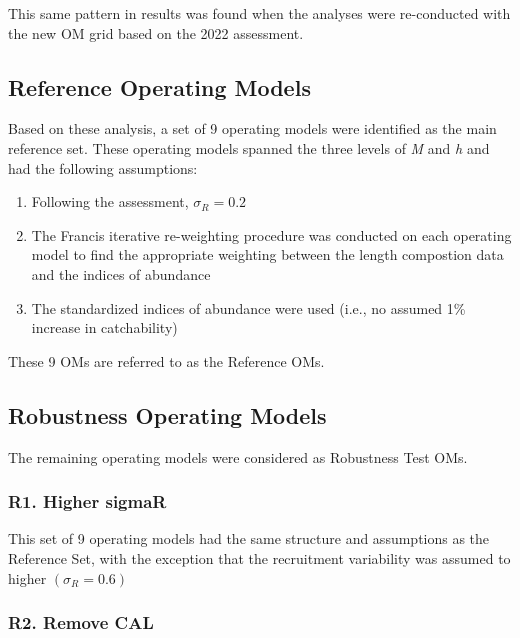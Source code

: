 \documentclass[
]{article}
\providecommand{\tightlist}{%
  \setlength{\itemsep}{0pt}\setlength{\parskip}{0pt}}
\begin{document}
This same pattern in results was found when the analyses were re-conducted with the new OM grid based on the 2022 assessment.

\hypertarget{reference-operating-models}{%
\subsection{Reference Operating Models}\label{reference-operating-models}}

Based on these analysis, a set of 9 operating models were identified as the main reference set. These operating models spanned the three levels of \emph{M} and \emph{h} and had the following assumptions:

\begin{enumerate}
\def\labelenumi{\arabic{enumi}.}
\tightlist
\item
  Following the assessment, \(\sigma_R = 0.2\)
\item
  The Francis iterative re-weighting procedure was conducted on each operating model to find the appropriate weighting between the length compostion data and the indices of abundance
\item
  The standardized indices of abundance were used (i.e., no assumed 1\% increase in catchability)
\end{enumerate}

These 9 OMs are referred to as the Reference OMs.

\hypertarget{robustness-operating-models}{%
\subsection{Robustness Operating Models}\label{robustness-operating-models}}

The remaining operating models were considered as Robustness Test OMs.

\hypertarget{r1.-higher-sigmar}{%
\subsubsection{R1. Higher sigmaR}\label{r1.-higher-sigmar}}

This set of 9 operating models had the same structure and assumptions as the Reference Set, with the exception that the recruitment variability was assumed to higher \((\sigma_R = 0.6)\)

\hypertarget{r2.-remove-cal}{%
\subsubsection{R2. Remove CAL}\label{r2.-remove-cal}}
\end{document}
